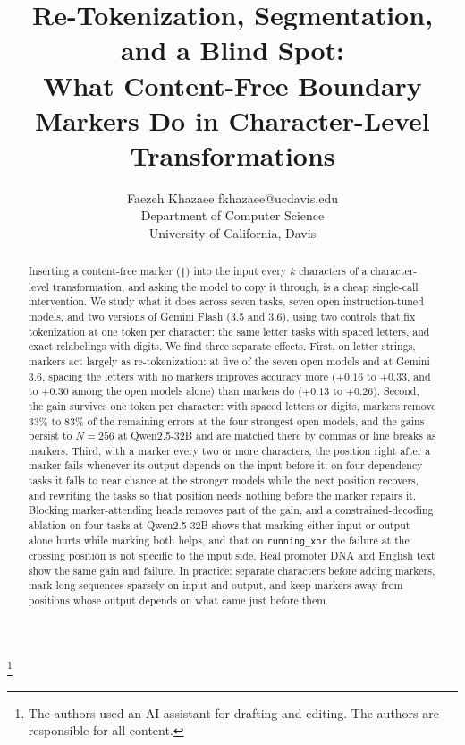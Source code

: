 \documentclass[10pt]{article} %
\title{Re-Tokenization, Segmentation, and a Blind Spot:\\
What Content-Free Boundary Markers Do in Character-Level Transformations}
\author{\name Faezeh Khazaee \email fkhazaee@ucdavis.edu \\
      \addr Department of Computer Science \\ University of California, Davis}
\newcommand{\task}[1]{\texttt{#1}}
\newcommand\blfootnote[1]{%
  \begingroup\renewcommand\thefootnote{}\footnote{#1}%
  \addtocounter{footnote}{-1}\endgroup}
\begin{document}
\maketitle

\begin{abstract}
Inserting a content-free marker (\texttt{|}) into the input every $k$ characters of a character-level transformation, and asking the model to copy it through, is a cheap single-call intervention. We study what it does across seven tasks, seven open instruction-tuned models, and two versions of Gemini Flash (3.5 and 3.6), using two controls that fix tokenization at one token per character: the same letter tasks with spaced letters, and exact relabelings with digits. We find three separate effects. First, on letter strings, markers act largely as re-tokenization: at five of the seven open models and at Gemini 3.6, spacing the letters with no markers improves accuracy more ($+0.16$ to $+0.33$, and to $+0.30$ among the open models alone) than markers do ($+0.13$ to $+0.26$). Second, the gain survives one token per character: with spaced letters or digits, markers remove 33\% to 83\% of the remaining errors at the four strongest open models, and the gains persist to $N = 256$ at Qwen2.5-32B and are matched there by commas or line breaks as markers. Third, with a marker every two or more characters, the position right after a marker fails whenever its output depends on the input before it: on four dependency tasks it falls to near chance at the stronger models while the next position recovers, and rewriting the tasks so that position needs nothing before the marker repairs it. Blocking marker-attending heads removes part of the gain, and a constrained-decoding ablation on four tasks at Qwen2.5-32B shows that marking either input or output alone hurts while marking both helps, and that on \task{running\_xor} the failure at the crossing position is not specific to the input side. Real promoter DNA and English text show the same gain and failure. In practice: separate characters before adding markers, mark long sequences sparsely on input and output, and keep markers away from positions whose output depends on what came just before them.
\end{abstract}

\blfootnote{The authors used an AI assistant for drafting and editing. The authors are responsible for all content.}
\end{document}
